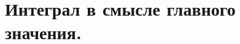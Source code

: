 \documentclass[../main.tex]{subfiles}
\begin{document}
\newpage
\section{Интеграл в смысле главного значения.}
\end{document}
